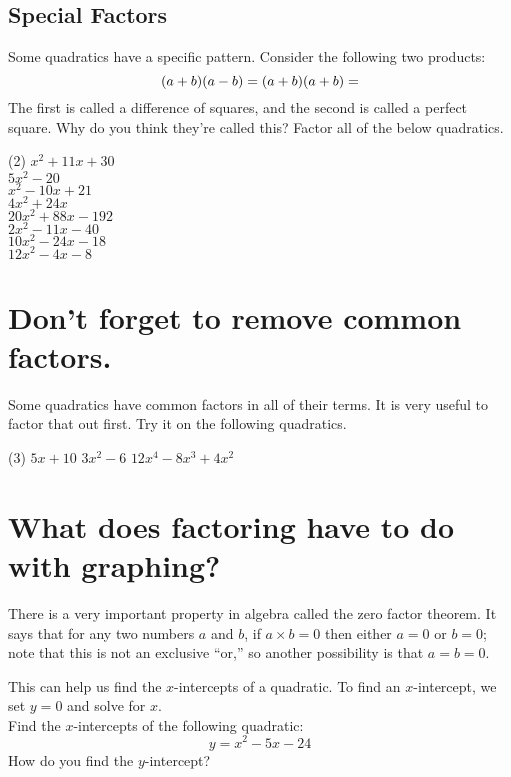 \documentclass[12pt,fleqn]{book}
\begin{document}
\subsection*{Special Factors}
Some quadratics have a specific pattern.  Consider the following two products:
\[
    (a+b)(a-b) = 
    \hfill 
    (a+b)(a+b) =
    \hfill 
\]
The first is called a difference of squares, and the second is called a perfect square.  Why do you think they're called this?
\vfill 
\clearpage
Factor all of the below quadratics.
\begin{tasks}(2)
	\task $x^2+11x + 30$\\[2em]
	\task $5x^2 - 20 $\\[2em]
	\task $x^2-10x +21 $\\[2em]
	\task $4x^2 + 24x $\\[2em]
	\task $20x^2+88x-192 $\\[2em]
	\task $2x^2 -11x -40 $\\[2em]
	\task $10x^2 -24x -18 $\\[2em]
	\task $12x^2-4x-8$\\[2em]
\end{tasks}
\section*{Don't forget to remove common factors.}
Some quadratics have common factors in all of their terms.  It is very useful to factor that out first.  Try it on the following quadratics.
\begin{tasks}(3)
\task $5 x+10$
\task $3 x^2-6$
\task $12 x^4-8 x^3+4 x^2$
\end{tasks}
\vspace{1.5in}
\section*{What does factoring have to do with graphing?}
There is a very important property in algebra called the zero factor theorem.  It says that for any two numbers $a$ and $b$, if $a\times b = 0$ then either $a=0$ or $b=0$; note that this is not an exclusive ``or,'' so another possibility is that $a=b=0$. 

This can help us find the $x$-intercepts of a quadratic.  To find an $x$-intercept, we set $y=0$ and solve for $x$.
\\[1em]
Find the $x$-intercepts of the following quadratic:
\[y=x^2-5x-24\]
\vfill How do you find the $y$-intercept?
\clearpage
\end{document}
